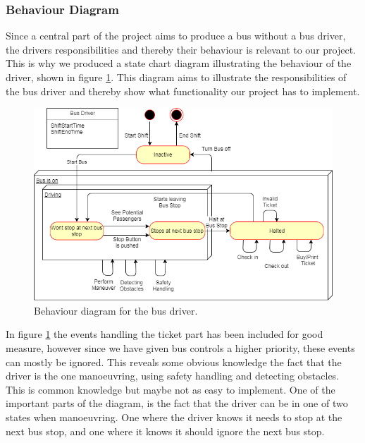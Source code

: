 \subsubsection{Behaviour Diagram}

Since a central part of the project aims to produce a bus without a bus driver, the drivers responsibilities and thereby their behaviour is relevant to our project. This is why we produced a state chart diagram illustrating the behaviour of the driver, shown in figure \ref{BehaviorDiagramBusDriver}. This diagram aims to illustrate the responsibilities of the bus driver and thereby show what functionality our project has to implement.

\begin{figure}[H]
\centering
\includegraphics[scale=0.6]{Images/BehaviorDiagramBusDriver.png}
\caption{Behaviour diagram for the bus driver.}
\label{BehaviorDiagramBusDriver}
\end{figure}

In figure \ref{BehaviorDiagramBusDriver} the events handling the ticket part has been included for good measure, however since we have given bus controls a higher priority, these events can mostly be ignored. This reveals some obvious knowledge the fact that the driver is the one manoeuvring, using safety handling and detecting obstacles. This is common knowledge but maybe not as easy to implement. One of the important parts of the diagram, is the fact that the driver can be in one of two states when manoeuvring. One where the driver knows it needs to stop at the next bus stop, and one where it knows it should ignore the next bus stop. 
